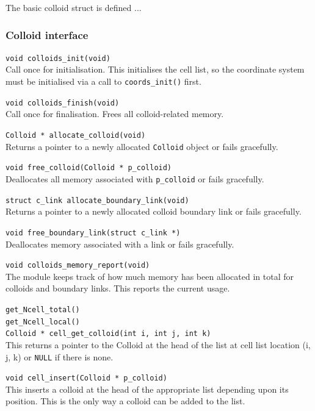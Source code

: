 The basic colloid struct is defined ...
 

\subsubsection{Colloid interface}

\texttt{void colloids\_init(void)}\\
Call once for initialisation. This initialises the cell list,
so the coordinate system must be initialised via a call to
\texttt{coords\_init()} first.

\texttt{void colloids\_finish(void)}\\
Call once for finalisation. Frees all colloid-related memory.

\texttt{Colloid * allocate\_colloid(void)}\\
Returns a pointer to a newly allocated \texttt{Colloid} object
or fails gracefully.

\texttt{void free\_colloid(Colloid * p\_colloid)}\\
Deallocates all memory associated with \texttt{p\_colloid} or
fails gracefully.

\texttt{struct c\_link allocate\_boundary\_link(void)}\\
Returns a pointer to a newly allocated colloid boundary
link or fails gracefully.

\texttt{void free\_boundary\_link(struct c\_link *)}\\
Deallocates memory associated with a link or fails gracefully.

\texttt{void colloids\_memory\_report(void)}\\
The module keeps track of how much memory has been allocated in
total for colloids and boundary links. This reports the current
usage.

\texttt{get\_Ncell\_total()}\\

\texttt{get\_Ncell\_local()}\\

\texttt{Colloid * cell\_get\_colloid(int i, int j, int k)}\\
This returns a pointer to the Colloid at the head of the list at
cell list location (i, j, k) or \texttt{NULL} if there is none.

\texttt{void cell\_insert(Colloid * p\_colloid)}\\
This inserts a colloid at the head of the appropriate list
depending upon its position. This is the only way a colloid
can be added to the list.

